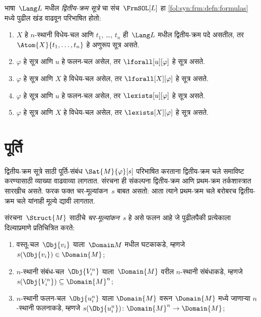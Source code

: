 \begin{defn}[द्वितीय-क्रम सूत्र]
भाषा~$\Lang L$
मधील \emph{द्वितीय-क्रम
सूत्रे} चा
संच~$\FrmSOL[L]$
हा \ref{fol:syn:frm:defn:formulas}
मध्ये पुढील
खंड वाढवून
परिभाषित होतो:
\begin{enumerate}
\item $X$ हे
  $n$-स्थानी
  विधेय-चल
  आणि $t_1$,
  \dots, $t_n$
  ही~$\Lang L$
मधील द्वितीय-क्रम
पदे असतील, तर
  $\Atom{X}{t_1,\ldots, t_n}$
  हे अणुरूप
  सूत्र
  असते.

\item $\varphi$ हे सूत्र आणि $u$ हे फलन-चल असेल,
  तर $\lforall[u][\varphi]$ हे सूत्र असते.

\item $\varphi$ हे सूत्र आणि $X$ हे विधेय-चल असेल,
  तर $\lforall[X][\varphi]$ हे सूत्र असते.

\item $\varphi$ हे सूत्र आणि $u$ हे फलन-चल असेल,
  तर $\lexists[u][\varphi]$ हे सूत्र असते.

\item $\varphi$ हे सूत्र आणि $X$ हे विधेय-चल असेल,
  तर $\lexists[X][\varphi]$ हे सूत्र असते.
\end{enumerate}
\end{defn}












\section{पूर्ति}\label{sol:syn:sat:sec}

\begin{explain}
द्वितीय-क्रम
सूत्रे साठी
पूर्ति-संबंध
$\Sat{M}{\varphi}[s]$
परिभाषित करताना
द्वितीय-क्रम
चले
समाविष्ट करण्यासाठी
व्याख्या वाढवाव्या
लागतात.
संरचना
ही संकल्पना
द्वितीय-क्रम
आणि प्रथम-क्रम
तर्कशास्त्रात
सारखीच असते.
फरक फक्त
चर-मूल्यांकन~$s$
बाबत असतो:
आता त्याने
प्रथम-क्रम
चले
बरोबरच
द्वितीय-क्रम
चले
यांनाही मूल्ये
द्यावी लागतात.
\end{explain}

\begin{defn}[चर-मूल्यांकन]
संरचना~$\Struct{M}$
साठीचे
\emph{चर-मूल्यांकन}~$s$
हे असे फलन
आहे जे पुढीलपैकी
प्रत्येकाला
दिल्याप्रमाणे
प्रतिचित्रित करते:
\begin{enumerate}
\item वस्तू-चल~$\Obj{v_i}$
  याला~$\Domain M$
  मधील घटकाकडे,
  म्हणजे
  $s(\Obj{v_i}) \in \Domain{M}$;
\item $n$-स्थानी
  संबंध-चल~$\Obj{V_i^n}$
  याला~$\Domain{M}$
  वरील $n$-स्थानी
  संबंधाकडे,
  म्हणजे
  $s(\Obj{V_i^n}) \subseteq \Domain{M}^n$;
\item $n$-स्थानी
  फलन-चल~$\Obj{u_i^n}$
  याला
  $\Domain{M}$
  वरून $\Domain{M}$
  मध्ये जाणाऱ्या
  $n$-स्थानी
  फलनाकडे,
  म्हणजे
  $s(\Obj{u_i^n})\colon \Domain{M}^n \to \Domain{M}$;
\end{enumerate}
\end{defn}

